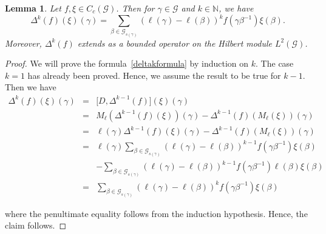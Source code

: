 \documentclass[a4paper,11pt,reqno]{amsart}
\theoremstyle{plain}
\newtheorem{lem}[thm]{Lemma}
\theoremstyle{named}
\numberwithin{equation}{section}
\def\N{\mathbb{N}}
\newcommand{\Bea}{\begin{eqnarray*}}
\newcommand{\Eea}{\end{eqnarray*}}
\begin{document}
			\begin{lem}
				Let \(f,\xi\in C_c(\mathcal{G})\). Then for \(\gamma \in \mathcal{G}\) and \(k\in \N\), we have
				\begin{equation}
					\label{deltakformula}
					\Delta^k (f) (\xi) (\gamma) = \sum\limits_{\beta \in \mathcal G_{s(\gamma)}} \left (\ell (\gamma) - \ell (\beta) \right )^k f \left (\gamma \beta^{-1} \right ) \xi (\beta).   
				\end{equation}
				Moreover, $\Delta^{k}(f)$ extends as a bounded operator on the Hilbert module $L^{2}(\mathcal G)$. %
			\end{lem}
			\begin{proof}
				We will prove the formula~\eqref{deltakformula} by induction on $k.$ The case $k=1$ has already been proved. Hence, we assume the result to be true for $k - 1.$ Then we have
				\Bea
				\Delta^k (f) (\xi) (\gamma) & = & \big [D, \Delta^{k-1} (f) \big ] (\xi) (\gamma) \\ & = & M_{\ell} \left (\Delta^{k - 1} (f) (\xi) \right ) (\gamma) - \Delta^{k -1} (f) \left (M_{\ell} (\xi) \right ) (\gamma) \\ & = & \ell (\gamma) \Delta^{k - 1} (f) (\xi) (\gamma) - \Delta^{k -1} (f) \left (M_{\ell} (\xi) \right ) (\gamma) \\ & = & \ell (\gamma) \sum\limits_{\beta \in \mathcal G_{s(\gamma)}} \left (\ell (\gamma) - \ell (\beta) \right )^{k -1} f \left (\gamma \beta^{-1} \right ) \xi (\beta) \\ &&  - \sum\limits_{\beta \in \mathcal G_{s(\gamma)}} \left (\ell (\gamma) - \ell (\beta) \right )^{k - 1} f \left (\gamma \beta^{-1} \right ) \ell (\beta) \xi (\beta) \\ & = & \sum\limits_{\beta \in \mathcal G_{s(\gamma)}} \left (\ell (\gamma) - \ell (\beta) \right )^k f \left (\gamma \beta^{-1} \right ) \xi (\beta)  
				\Eea
				
				where the penultimate equality follows from the induction hypothesis. Hence, the claim follows.
				

\end{proof}
\end{document}
